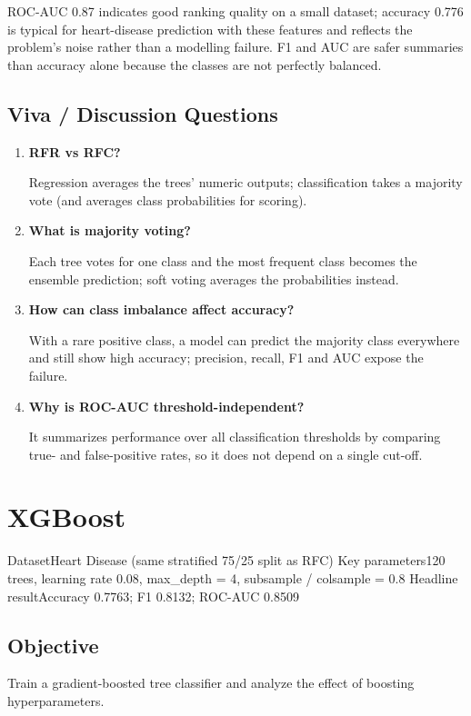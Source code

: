 ROC-AUC 0.87 indicates good ranking quality on a small dataset; accuracy 0.776 is typical for
heart-disease prediction with these features and reflects the problem's noise rather than a
modelling failure. F1 and AUC are safer summaries than accuracy alone because the classes are
not perfectly balanced.

\section{Viva / Discussion Questions}
\begin{enumerate}
  \item \textbf{RFR vs RFC?}\par\nobreak Regression averages the trees' numeric outputs; classification takes a
  majority vote (and averages class probabilities for scoring).
  \item \textbf{What is majority voting?}\par\nobreak Each tree votes for one class and the most frequent class
  becomes the ensemble prediction; soft voting averages the probabilities instead.
  \item \textbf{How can class imbalance affect accuracy?}\par\nobreak With a rare positive class, a model can
  predict the majority class everywhere and still show high accuracy; precision, recall, F1 and
  AUC expose the failure.
\item \textbf{Why is ROC-AUC threshold-independent?}\par\nobreak It summarizes performance over all classification thresholds by comparing true- and false-positive rates, so it does not depend on a single cut-off.
\end{enumerate}


\chapter{XGBoost}\label{exp:10}


\quickfacts
  {Dataset}{Heart Disease (same stratified 75/25 split as RFC)}
  {Key parameters}{120 trees, learning rate 0.08, max\_depth = 4, subsample / colsample = 0.8}
  {Headline result}{Accuracy 0.7763; F1 0.8132; ROC-AUC 0.8509}

\section{Objective}
Train a gradient-boosted tree classifier and analyze the effect of boosting
hyperparameters.

